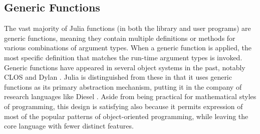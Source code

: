 \documentclass[9pt]{sigplanconf}
\begin{document}








\subsection{Generic Functions}


The vast majority of Julia functions (in both the library and user programs)
are generic functions, meaning they contain multiple definitions or methods for
various combinations of argument types. When a generic function is applied,
the most specific definition that matches the run-time argument types is
invoked. Generic functions have appeared in several object systems in the past,
notably CLOS \cite{closoverview} and Dylan \cite{dylanlang}.
Julia is distinguished from these in that
it uses generic functions as its primary abstraction mechanism, putting it in
the company of research languages like Diesel \cite{dieselspec}. Aside
from being practical for mathematical styles of programming,
this design is satisfying also because it permits
expression of most of the popular patterns of object-oriented programming,
while leaving the core language with fewer distinct features.
\end{document}

